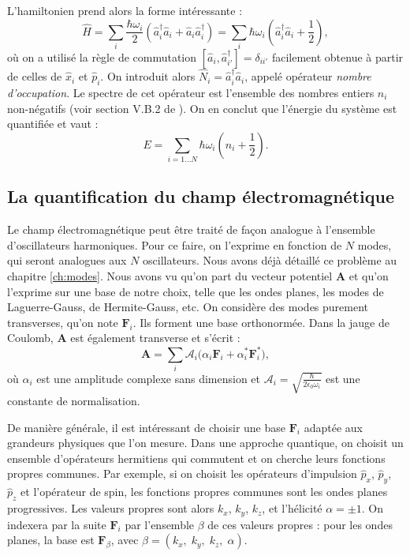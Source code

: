 L'hamiltonien prend alors la forme intéressante :
\begin{equation}
\hat{H}=\sum_i \frac{\hbar\omega_i}{2}\left(\hat{a}^{\dag}_{i}\hat{a}_{i}+\hat{a}_{i}\hat{a}^{\dag}_{i}\right)
=\sum_i \hbar\omega_i\left(\hat{a}^{\dag}_{i}\hat{a}_{i}+\frac{1}{2}\right),
\end{equation}
où on a utilisé la règle de commutation $\left[\hat{a}_{i},\hat{a}^{\dag}_{i'}\right] = \delta_{ii'}$ facilement obtenue à partir de celles de $\hat{x}_i$ et $\hat{p}_i$. On introduit alors $\hat{N}_i=\hat{a}^{\dag}_{i}\hat{a}_{i}$, appelé opérateur \textit{nombre d'occupation}. Le spectre de cet opérateur est l'ensemble des nombres entiers $n_i$ non-négatifs (voir section V.B.2 de ). On en conclut que l'énergie du système est quantifiée et vaut :
\begin{equation}
E = \sum_{i=1\ldots N} \hbar \omega_i (n_i + \frac{1}{2}).
\end{equation}


\subsection{La quantification du champ électromagnétique}
\label{sec:quant_EM}
Le champ électromagnétique peut être traité de façon analogue à l'ensemble d'oscillateurs harmoniques. Pour ce faire, on l'exprime en fonction de $N$ modes, qui seront analogues aux $N$ oscillateurs. Nous avons déjà détaillé ce problème au chapitre \ref{ch:modes}. Nous avons vu qu'on part du vecteur potentiel $\bm{A}$ et qu'on l'exprime sur une base de notre choix, telle que les ondes planes, les modes de Laguerre-Gauss, de Hermite-Gauss, etc. On considère des modes purement transverses, qu'on note $\bm{F}_i$. Ils forment une base orthonormée. Dans la jauge de Coulomb, $\bm{A}$ est également transverse et s'écrit :
\begin{equation}
\bm{A}=\sum_{i}{\mathcal{A}_i (\alpha_{i}\bm{F}_i+\alpha^*_{i}\bm{F}^*_i}),
\label{A_decomp_Flambda}
\end{equation}
où $\alpha_{i}$ est une amplitude complexe sans dimension et $\mathcal{A}_i=\sqrt{\frac{\hbar}{2\epsilon_0\omega_i}}$ est une constante de normalisation. 

De manière générale, il est intéressant de choisir une base $\bm{F}_i$ adaptée aux grandeurs physiques que l'on mesure. Dans une approche quantique, on choisit un ensemble d'opérateurs hermitiens qui commutent et on cherche leurs fonctions propres communes. Par exemple, si on choisit les opérateurs d'impulsion $\hat{p}_x$, $\hat{p}_y$, $\hat{p}_z$ et l'opérateur de spin, les fonctions propres communes sont les ondes planes progressives. Les valeurs propres sont alors $k_x$, $k_y$, $k_z$, et l'hélicité $\alpha = \pm 1$. On indexera par la suite $\bm{F}_i$ par l'ensemble $\beta$ de ces valeurs propres : pour les ondes planes, la base est $\bm{F}_{\beta}$, avec $\beta=(k_x,\;k_y,\;k_z,\;\alpha)$.

